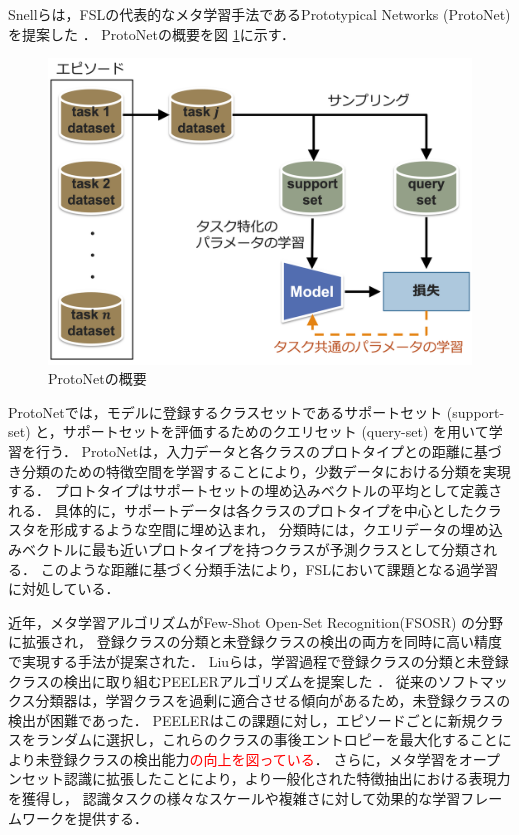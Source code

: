 \documentclass[a4paper,11pt,nomag]{jsreport}
\begin{document}
Snellらは，FSLの代表的なメタ学習手法であるPrototypical Networks (ProtoNet) を提案した \cite{protonet}．
ProtoNetの概要を図 \ref{fig:protonet}に示す．
% 
\begin{figure}[tbp]
  \centering
  \includegraphics[width=0.7\linewidth, keepaspectratio]{image/protonet.png}
  \caption{ProtoNetの概要}
  \label{fig:protonet}
\end{figure}
% 
ProtoNetでは，モデルに登録するクラスセットであるサポートセット (support-set) と，サポートセットを評価するためのクエリセット (query-set) を用いて学習を行う．
ProtoNetは，入力データと各クラスのプロトタイプとの距離に基づき分類のための特徴空間を学習することにより，少数データにおける分類を実現する．
プロトタイプはサポートセットの埋め込みベクトルの平均として定義される．
具体的に，サポートデータは各クラスのプロトタイプを中心としたクラスタを形成するような空間に埋め込まれ，
分類時には，クエリデータの埋め込みベクトルに最も近いプロトタイプを持つクラスが予測クラスとして分類される．
このような距離に基づく分類手法により，FSLにおいて課題となる過学習に対処している．

近年，メタ学習アルゴリズムがFew-Shot Open-Set Recognition(FSOSR) の分野に拡張され，
登録クラスの分類と未登録クラスの検出の両方を同時に高い精度で実現する手法が提案された．
Liuらは，学習過程で登録クラスの分類と未登録クラスの検出に取り組むPEELERアルゴリズムを提案した \cite{peeler}．
従来のソフトマックス分類器は，学習クラスを過剰に適合させる傾向があるため，未登録クラスの検出が困難であった．
PEELERはこの課題に対し，エピソードごとに新規クラスをランダムに選択し，これらのクラスの事後エントロピーを最大化することにより未登録クラスの検出能力\textcolor{red}{の向上を図っている}．
さらに，メタ学習をオープンセット認識に拡張したことにより，より一般化された特徴抽出における表現力を獲得し，
認識タスクの様々なスケールや複雑さに対して効果的な学習フレームワークを提供する．
\end{document}
